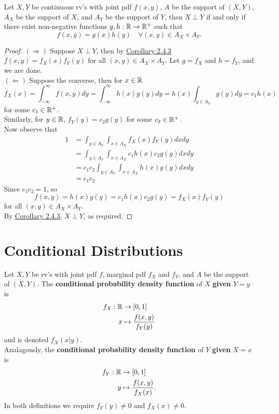 \documentclass[11pt,fleqn]{book} %
\begin{document}
\begin{theorem} Let \(X, Y\) be continuous rv's with joint pdf \(f(x, y)\), \(A\) be the support of \((X, Y)\), \(A_X\) be the support of \(X\), and \(A_Y\) be the support of \(Y\), then \(X \perp Y\) if and only if there exist non-negative functions \(g, h:\mathbb{R}\rightarrow\mathbb{R}^+\) such that
\[
f(x, y) = g(x)h(y) \quad \forall (x, y) \in A_X \times A_Y.
\]
\end{theorem}
\begin{proof} \((\Rightarrow)\) Suppose \(X \perp Y\), then by \hyperref[cor:243]{Corollary 2.4.3} \(f(x, y) = f_X(x)f_Y(y)\) for all \((x, y) \in A_X \times A_Y\). Let \(g = f_X\) and \(h = f_Y\), and we are done.\\
\((\Leftarrow)\) Suppose the converse, then for \(x \in \mathbb{R}\)
\[
f_X(x) = \int_{-\infty}^\infty f(x, y)dy = \int_{-\infty}^\infty h(x)g(y)dy = h(x)\int_{y \in A_Y}g(y)dy = c_1h(x)
\]
for some \(c_1 \in \mathbb{R}^+\).\\
\indent Similarly, for \(y \in \mathbb{R}\), \(f_Y(y) = c_2g(y)\) for some \(c_2 \in \mathbb{R}^+\). \\
\indent Now observe that
\[
\begin{aligned}
1 &= \int_{y \in A_Y}\int_{x \in A_X} f_X(x)f_Y(y)dxdy \\
&= \int_{y \in A_Y} \int_{x \in A_X} c_1h(x)c_2g(y)dxdy \\
&= c_1c_2 \int_{y \in A_Y} \int_{x \in A_X} h(x)g(y)dxdy \\
&= c_1c_2
\end{aligned}
\]
\indent Since \(c_1c_2 = 1\), so
\[
f(x, y) = h(x)g(y) = c_1h(x)c_2g(y) = f_X(x)f_Y(y)
\]
for all \((x, y) \in A_X \times A_Y\).\\
\indent By \hyperref[cor:243]{Corollary 2.4.3}, \(X \perp Y\), as required.
\end{proof}


\section{Conditional Distributions}

\begin{definition} \label{def:251}
Let \(X, Y\) be rv's with joint pdf \(f\), marginal pdf \(f_X\) and \(f_Y\), and \(A\) be the support of \((X, Y)\). The \textbf{conditional probability density function} of \(X\) \textbf{given} \(Y = y\) is
\[
\begin{aligned}
f_X: \mathbb{R} &\rightarrow [0, 1] \\
x &\mapsto \frac{f(x, y)}{f_Y(y)}
\end{aligned}
\]
and is denoted \(f_X(x|y)\).\\
\indent Analagously, the \textbf{conditional probability density function} of \(Y\) \textbf{given} \(X = x\) is
\[
\begin{aligned}
f_Y: \mathbb{R} &\rightarrow [0, 1] \\
y &\mapsto \frac{f(x, y)}{f_X(x)}.
\end{aligned}
\]
\indent In both definitions we require \(f_Y(y) \neq 0\) and \(f_X(x) \neq 0\).
\end{definition}
\end{document}

